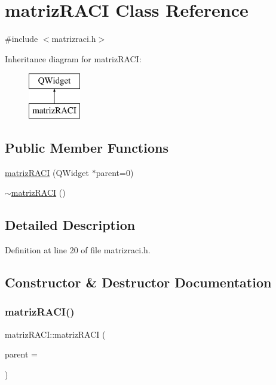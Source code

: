 \hypertarget{classmatriz_r_a_c_i}{}\section{matriz\+R\+A\+CI Class Reference}
\label{classmatriz_r_a_c_i}


{\ttfamily \#include $<$matrizraci.\+h$>$}

Inheritance diagram for matriz\+R\+A\+CI\+:\begin{figure}[H]
\begin{center}
\leavevmode
\includegraphics[height=2.000000cm]{classmatriz_r_a_c_i}
\end{center}
\end{figure}
\subsection*{Public Member Functions}
\begin{DoxyCompactItemize}
\item 
\hyperlink{classmatriz_r_a_c_i_ae380d9647713f9dc8c4dbc275f69a672}{matriz\+R\+A\+CI} (Q\+Widget $\ast$parent=0)
\item 
\hyperlink{classmatriz_r_a_c_i_acf5d48703954736fe205c918333950a0}{$\sim$matriz\+R\+A\+CI} ()
\end{DoxyCompactItemize}


\subsection{Detailed Description}


Definition at line 20 of file matrizraci.\+h.



\subsection{Constructor \& Destructor Documentation}
\hypertarget{classmatriz_r_a_c_i_ae380d9647713f9dc8c4dbc275f69a672}{}\label{classmatriz_r_a_c_i_ae380d9647713f9dc8c4dbc275f69a672} 
\subsubsection{\texorpdfstring{matriz\+R\+A\+C\+I()}{matrizRACI()}}
{\footnotesize\ttfamily matriz\+R\+A\+C\+I\+::matriz\+R\+A\+CI (\begin{DoxyParamCaption}\item[{Q\+Widget $\ast$}]{parent = {} }\end{DoxyParamCaption})\hspace{0.3cm}{\ttfamily [explicit]}}




